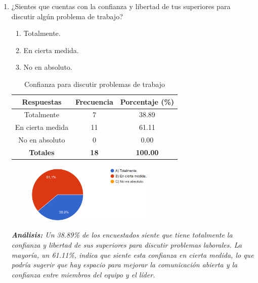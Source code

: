 \documentclass[journal]{IEEEtran}
\begin{document}
\begin{enumerate}
	\item ¿Sientes que cuentas con la confianza y libertad de tus superiores para discutir algún problema de trabajo?
	\begin{enumerate}
		\item Totalmente.
		\item En cierta medida.
		\item No en absoluto.
	\end{enumerate}
	\begin{table}[H]
		\renewcommand{\arraystretch}{1.3}
		\centering
		\caption{Confianza para discutir problemas de trabajo}
		\begin{tabular}{c c c}
			\hline
			\textbf{Respuestas} & \textbf{Frecuencia} & \textbf{Porcentaje (\%)}\\
			\hline
			Totalmente & 7 & 38.89\\
			En cierta medida & 11 & 61.11\\
			No en absoluto & 0 & 0.00\\
			\hline
			\textbf{Totales} &\textbf{18}& \textbf{100.00}\\
			\hline
		\end{tabular}
	\end{table}
	\begin{figure}[h]
		\centering
		\includegraphics[width=06cm]{Pregunta16}
	\end{figure}
	\textit{\textbf{Análisis:} Un 38.89\% de los encuestados siente que tiene totalmente la confianza y libertad de sus superiores para discutir problemas laborales. La mayoría, un 61.11\%, indica que siente esta confianza en cierta medida, lo que podría sugerir que hay espacio para mejorar la comunicación abierta y la confianza entre miembros del equipo y el líder.}\\
	

\end{enumerate}
\end{document}
